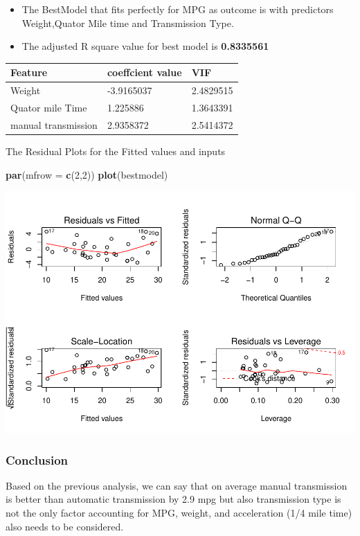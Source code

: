 \documentclass[
]{article}
\newenvironment{Shaded}{\begin{snugshade}}{\end{snugshade}}
\newcommand{\DataTypeTok}[1]{\textcolor[rgb]{0.13,0.29,0.53}{#1}}
\newcommand{\DecValTok}[1]{\textcolor[rgb]{0.00,0.00,0.81}{#1}}
\newcommand{\KeywordTok}[1]{\textcolor[rgb]{0.13,0.29,0.53}{\textbf{#1}}}
\newcommand{\NormalTok}[1]{#1}
\begin{document}
\begin{itemize}
\item
  The BestModel that fits perfectly for MPG as outcome is with
  predictors Weight,Quator Mile time and Transmission Type.
\item
  The adjusted R square value for best model is \textbf{0.8335561}
\end{itemize}

\begin{longtable}[]{@{}lll@{}}
\toprule
Feature & coeffcient value & VIF\tabularnewline
\midrule
\endhead
Weight & -3.9165037 & 2.4829515\tabularnewline
Quator mile Time & 1.225886 & 1.3643391\tabularnewline
manual transmission & 2.9358372 & 2.5414372\tabularnewline
\bottomrule
\end{longtable}

The Residual Plots for the Fitted values and inputs

\begin{Shaded}
\begin{Highlighting}[]
\KeywordTok{par}\NormalTok{(}\DataTypeTok{mfrow =} \KeywordTok{c}\NormalTok{(}\DecValTok{2}\NormalTok{,}\DecValTok{2}\NormalTok{))}
\KeywordTok{plot}\NormalTok{(bestmodel)}
\end{Highlighting}
\end{Shaded}

\includegraphics{MotorTrendAnalysis_files/figure-latex/unnamed-chunk-3-1.pdf}

\hypertarget{conclusion}{%
\subsubsection{Conclusion}\label{conclusion}}

Based on the previous analysis, we can say that on average manual
transmission is better than automatic transmission by 2.9 mpg but also
transmission type is not the only factor accounting for MPG, weight, and
acceleration (1/4 mile time) also needs to be considered.
\end{document}
